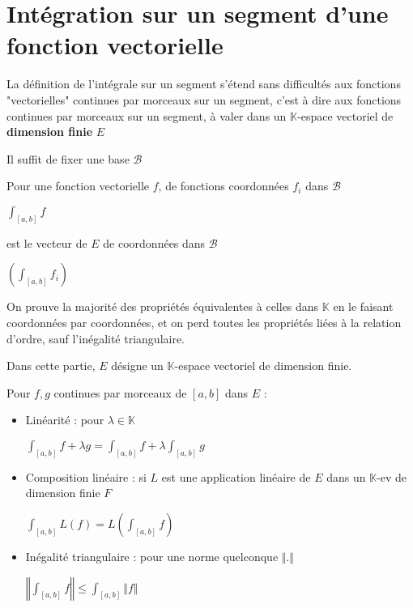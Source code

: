 \documentclass[a4paper,12pt]{book}
\newcommand{\Prop}[2]{\begin{tcolorbox}[sharp corners, colback=white,colframe=red!90!black!75, title=Proposition : #1]#2\end{tcolorbox}}
\def\K{\mathbb{K}}
\begin{document}
\section{Intégration sur un segment d'une fonction vectorielle}
La définition de l'intégrale sur un segment s'étend sans difficultés aux fonctions "vectorielles" continues par morceaux sur un segment, c'est à dire aux fonctions continues par morceaux sur un segment, à valer dans un $\K$-espace vectoriel de \textbf{dimension finie} $E$ \par Il suffit de fixer une base $\mathcal{B}$ \par Pour une fonction vectorielle $f$, de fonctions coordonnées $f_i$ dans $\mathcal{B}$ \par \begin{center} $\int_{[a,b]}f$\end{center} \par est le vecteur de $E$ de coordonnées dans $\mathcal{B}$ \par\begin{center}$\left(\int_{[a,b]}f_i\right)$\end{center}
\par On prouve la majorité des propriétés équivalentes à celles dans $\K$ en le faisant coordonnées par coordonnées, et on perd toutes les propriétés liées à la relation d'ordre, sauf l'inégalité triangulaire. \par Dans cette partie, $E$ désigne un $\K$-espace vectoriel de dimension finie.
\Prop{}{Pour $f,g$ continues par morceaux de $[a,b]$ dans $E$ :\begin{itemize}
\item Linéarité : pour $\lambda\in\K$ \par\begin{center} $\int_{[a,b]}f+\lambda g=\int_{[a,b]}f+\lambda \int_{[a,b]}g$\end{center}
\item Composition linéaire : si $L$ est une application linéaire de $E$ dans un $\K$-ev de dimension finie $F$ \par \begin{center}$\int_{[a,b]}L(f)=L\left(\int_{[a,b]}f\right)$\end{center}
\item Inégalité triangulaire : pour une norme quelconque $\Vert.\Vert$ \par \begin{center}$\left\Vert\int_{[a,b]}f\right\Vert\leq\int_{[a,b]}\Vert f\Vert$\end{center}
\end{itemize}}
\end{document}
